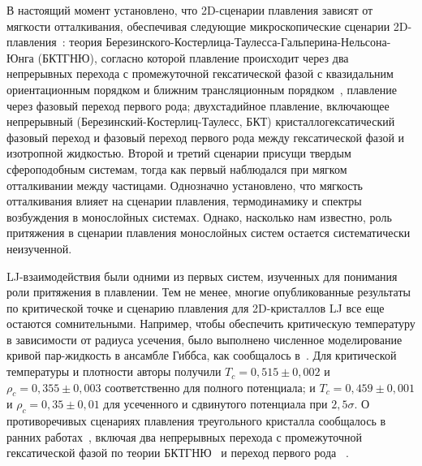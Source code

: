 В настоящий момент установлено, что 2D-сценарии плавления зависят от мягкости отталкивания, обеспечивая следующие микроскопические сценарии 2D-плавления~\cite{10.3367/ufne.2017.06.038161, 10.3367/ufne.2018.04.038417}: теория Березинского-Костерлица-Таулесса-Гальперина-Нельсона-Юнга (БКТГНЮ), согласно которой плавление происходит через два непрерывных перехода с промежуточной гексатической фазой с квазидальним ориентационным порядком и ближним трансляционным порядком~\cite{10.1088/0022-3719/6/7/010, 10.1103/physrevlett.41.121, 10.1103/physrevb.19.2457, 10.1103/physrevb.19.1855}, плавление через фазовый переход первого рода; двухстадийное плавление, включающее непрерывный (Березинский-Костерлиц-Таулесс, БКТ) кристаллогексатический фазовый переход и фазовый переход первого рода между гексатической фазой и изотропной жидкостью.
Второй и третий сценарии присущи твердым сфероподобным системам, тогда как первый наблюдался при мягком отталкивании между частицами. Однозначно установлено, что мягкость отталкивания влияет на сценарии плавления, термодинамику и спектры возбуждения в монослойных системах. Однако, насколько нам известно, роль притяжения в сценарии плавления монослойных систем остается систематически неизученной.

LJ-взаимодействия были одними из первых систем, изученных для понимания роли притяжения в плавлении. Тем не менее, многие опубликованные результаты по критической точке и сценарию плавления для 2D-кристаллов LJ все еще остаются сомнительными. Например, чтобы обеспечить критическую температуру в зависимости от радиуса усечения, было выполнено численное моделирование кривой пар-жидкость в ансамбле Гиббса, как сообщалось в~\cite{10.1063/1.460477}. Для критической температуры и плотности авторы получили $T_c =0,515 \pm 0,002$ и $\rho_c = 0,355 \pm 0,003$ соответственно для полного потенциала; и $T_c = 0,459\pm 0,001$ и $\rho_c = 0,35\pm 0,01$ для усеченного и сдвинутого потенциала при $2,5\sigma$. 
О противоречивых сценариях плавления треугольного кристалла сообщалось в ранних работах~\cite{10.1103/physrevlett.42.1632, 10.1063/1.436526, 10.1103/physrevlett.44.463, 10.1063/1.441901, 10.1103/physrevlett.52.449, 10.1103/physrevb.30.2755}, включая два непрерывных перехода с промежуточной гексатической фазой по теории БКТГНЮ~\cite{10.1103/physrevlett.42.1632} и переход первого рода ~\cite{10.1063/1.436526, 10.1103/physrevlett.44.463, 10.1063/1.441901, 10.1103/physrevlett.52.449}.

